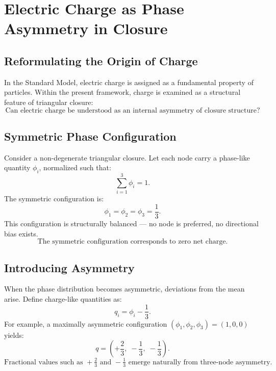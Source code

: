 \section{Electric Charge as Phase Asymmetry in Closure}
\label{sec:charge}

\subsection{Reformulating the Origin of Charge}

In the Standard Model, electric charge is assigned as a fundamental property
of particles.
Within the present framework, charge is examined as a structural feature
of triangular closure:
\begin{equation}
  \boxed{
    \text{Can electric charge be understood as an internal asymmetry
    of closure structure?}
  }
\end{equation}

\subsection{Symmetric Phase Configuration}

Consider a non-degenerate triangular closure.
Let each node carry a phase-like quantity $\phi_i$, normalized such that:
\begin{equation}
  \sum_{i=1}^{3} \phi_i = 1.
\end{equation}
The symmetric configuration is:
\begin{equation}
  \phi_1 = \phi_2 = \phi_3 = \frac{1}{3}.
\end{equation}
This configuration is structurally balanced --- no node is preferred,
no directional bias exists.
\begin{equation}
  \boxed{\text{The symmetric configuration corresponds to zero net charge.}}
\end{equation}

\subsection{Introducing Asymmetry}

When the phase distribution becomes asymmetric,
deviations from the mean arise.
Define charge-like quantities as:
\begin{equation}
  q_i = \phi_i - \frac{1}{3}.
\end{equation}
For example, a maximally asymmetric configuration
$(\phi_1, \phi_2, \phi_3) = (1, 0, 0)$ yields:
\begin{equation}
  q = \left(+\frac{2}{3},\; -\frac{1}{3},\; -\frac{1}{3}\right).
\end{equation}
\begin{equation}
  \boxed{
    \text{Fractional values such as } +\tfrac{2}{3} \text{ and } -\tfrac{1}{3}
    \text{ emerge naturally from three-node asymmetry.}
  }
\end{equation}

